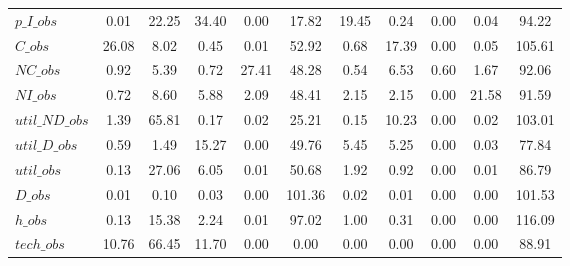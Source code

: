 \begin{center}
\begin{longtable}{lcccccccccc}
$p\_I\_obs      $	 & 	                0.01	 & 	               22.25	 & 	               34.40	 & 	                0.00	 & 	               17.82	 & 	               19.45	 & 	                0.24	 & 	                0.00	 & 	                0.04	 & 	               94.22 \\ 
$C\_obs         $	 & 	               26.08	 & 	                8.02	 & 	                0.45	 & 	                0.01	 & 	               52.92	 & 	                0.68	 & 	               17.39	 & 	                0.00	 & 	                0.05	 & 	              105.61 \\ 
$NC\_obs        $	 & 	                0.92	 & 	                5.39	 & 	                0.72	 & 	               27.41	 & 	               48.28	 & 	                0.54	 & 	                6.53	 & 	                0.60	 & 	                1.67	 & 	               92.06 \\ 
$NI\_obs        $	 & 	                0.72	 & 	                8.60	 & 	                5.88	 & 	                2.09	 & 	               48.41	 & 	                2.15	 & 	                2.15	 & 	                0.00	 & 	               21.58	 & 	               91.59 \\ 
$util\_ND\_obs  $	 & 	                1.39	 & 	               65.81	 & 	                0.17	 & 	                0.02	 & 	               25.21	 & 	                0.15	 & 	               10.23	 & 	                0.00	 & 	                0.02	 & 	              103.01 \\ 
$util\_D\_obs   $	 & 	                0.59	 & 	                1.49	 & 	               15.27	 & 	                0.00	 & 	               49.76	 & 	                5.45	 & 	                5.25	 & 	                0.00	 & 	                0.03	 & 	               77.84 \\ 
$util\_obs      $	 & 	                0.13	 & 	               27.06	 & 	                6.05	 & 	                0.01	 & 	               50.68	 & 	                1.92	 & 	                0.92	 & 	                0.00	 & 	                0.01	 & 	               86.79 \\ 
$D\_obs         $	 & 	                0.01	 & 	                0.10	 & 	                0.03	 & 	                0.00	 & 	              101.36	 & 	                0.02	 & 	                0.01	 & 	                0.00	 & 	                0.00	 & 	              101.53 \\ 
$h\_obs         $	 & 	                0.13	 & 	               15.38	 & 	                2.24	 & 	                0.01	 & 	               97.02	 & 	                1.00	 & 	                0.31	 & 	                0.00	 & 	                0.00	 & 	              116.09 \\ 
$tech\_obs      $	 & 	               10.76	 & 	               66.45	 & 	               11.70	 & 	                0.00	 & 	                0.00	 & 	                0.00	 & 	                0.00	 & 	                0.00	 & 	                0.00	 & 	               88.91 \\ 
\end{longtable}
 \end{center}
